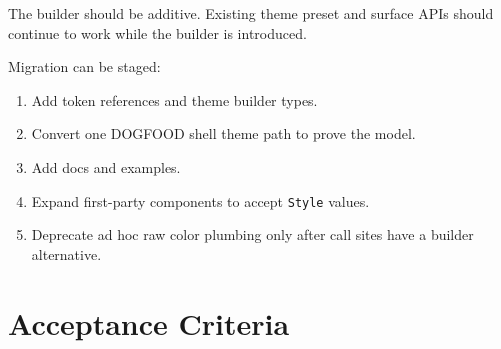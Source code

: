 The builder should be additive. Existing theme preset and surface APIs should continue to work while the builder is introduced.

Migration can be staged:

\begin{enumerate}
\def\labelenumi{\arabic{enumi}.}
\tightlist
\item
  Add token references and theme builder types.
\item
  Convert one DOGFOOD shell theme path to prove the model.
\item
  Add docs and examples.
\item
  Expand first-party components to accept \texttt{S\allowbreak{}t\allowbreak{}y\allowbreak{}l\allowbreak{}e} values.
\item
  Deprecate ad hoc raw color plumbing only after call sites have a builder alternative.
\end{enumerate}

\section{Acceptance Criteria}\label{record-178-acceptance-criteria}

